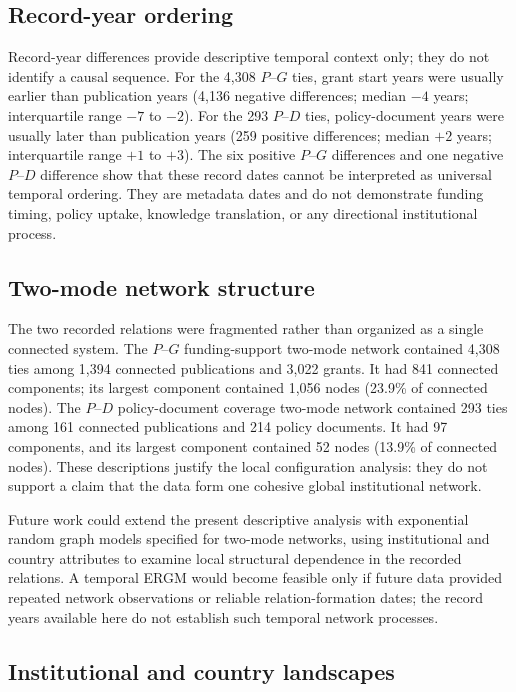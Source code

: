\documentclass[12pt]{article}
\begin{document}
\subsection{Record-year ordering}

Record-year differences provide descriptive temporal context only; they do not identify a causal sequence. For the 4,308 $P$--$G$ ties, grant start years were usually earlier than publication years (4,136 negative differences; median $-4$ years; interquartile range $-7$ to $-2$). For the 293 $P$--$D$ ties, policy-document years were usually later than publication years (259 positive differences; median $+2$ years; interquartile range $+1$ to $+3$). The six positive $P$--$G$ differences and one negative $P$--$D$ difference show that these record dates cannot be interpreted as universal temporal ordering. They are metadata dates and do not demonstrate funding timing, policy uptake, knowledge translation, or any directional institutional process.

\subsection{Two-mode network structure}

The two recorded relations were fragmented rather than organized as a single connected system. The $P$--$G$ funding-support two-mode network contained 4,308 ties among 1,394 connected publications and 3,022 grants. It had 841 connected components; its largest component contained 1,056 nodes (23.9\% of connected nodes). The $P$--$D$ policy-document coverage two-mode network contained 293 ties among 161 connected publications and 214 policy documents. It had 97 components, and its largest component contained 52 nodes (13.9\% of connected nodes). These descriptions justify the local configuration analysis: they do not support a claim that the data form one cohesive global institutional network.

Future work could extend the present descriptive analysis with exponential random graph models specified for two-mode networks, using institutional and country attributes to examine local structural dependence in the recorded relations. A temporal ERGM would become feasible only if future data provided repeated network observations or reliable relation-formation dates; the record years available here do not establish such temporal network processes.


\subsection{Institutional and country landscapes}
\end{document}
